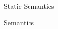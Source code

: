 \documentclass[11pt]{article}
\newcommand\expr[1]{|\,#1\;|}
\begin{document}
\begin{section}{Static Semantics}
\begin{subsection}{Semantics}
\begin{comment}
The partial function $\verb|ClassLoader| : \emph{javaRef} \rightharpoonup \verb|Class<|?\verb|>|$ is used to access java classes by using their abstract path name. The \verb|ClassLoader| is a component of the JVM standard used to access classes reflectively. \\

We define the initial state of the program. The initial namespace, $\Gamma_i$, is 
\[(x, \tau) \in \Gamma_i \iff (x, \verb|Class<|\tau\verb|>|) \in \verb|ClassLoader|, \tau <: \verb|Module|\]

When parsing, we also keep track of a \emph{secondary} context, $\mathcal{C} : \textbf{Ty}$, that keeps track of the current module type. This ensures that added submodules will also have a valid type with respect to their parent.\\

In order to formally define evaluation rules, we define the current state of the evaluation as $\textbf{St} = (\textbf{Ns}, \textbf{Ty})$. For any statement $s$ in our AST, $\expr{e} : \textbf{St} \rightharpoonup \textbf{St}$ is a partial function. We say $(\sigma, \sigma') \in \expr{e}$ if and only if the expression $e$ is valid with the starting state $\sigma$, and will conclude with an ending state $\sigma'$.\\
\begin{mathpar}
\inferrule{\;}
  {(\sigma, \sigma') \in \texttt{[]}}

\inferrule{(\sigma, \sigma') \in \expr{\emph{mod}}}
  {\sigma = \sigma'}

\inferrule{(\sigma, \sigma')\in \expr{\textsf{program}(\emph{imports}, \emph{mod})}}
  {\exists \sigma''. \;(\sigma, \sigma'') \in \expr{\emph{import}},\; (\sigma'', \sigma') \in \expr{\emph{mod}}}
  
\inferrule{(\Gamma, \mathcal{C}), (\Gamma', \mathcal{C}') \in \expr{\emph{import}}}
  {\mathcal{C} = \mathcal{C}' \\ }

\end{mathpar}\\
Notice that in our evaluation rules, we allow imports to shadow previously defined imports.\\
\end{comment}

\end{subsection}
\end{section}
\end{document}
